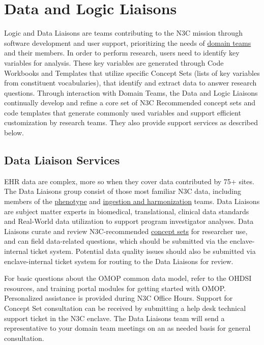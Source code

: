 \documentclass[
  letterpaper,
  DIV=11,
  numbers=noendperiod]{scrreprt}
\begin{document}
\hypertarget{sec-support-liaisons}{%
\section{Data and Logic Liaisons}\label{sec-support-liaisons}}

Logic and Data Liaisons are teams contributing to the N3C mission
through software development and user support, prioritizing the needs of
\protect\hyperlink{domain-teams}{domain teams} and their members. In
order to perform research, users need to identify key variables for
analysis. These key variables are generated through Code Workbooks and
Templates that utilize specific Concept Sets (lists of key variables
from constituent vocabularies), that identify and extract data to answer
research questions. Through interaction with Domain Teams, the Data and
Logic Liaisons continually develop and refine a core set of N3C
Recommended concept sets and code templates that generate commonly used
variables and support efficient customization by research teams. They
also provide support services as described below.

\hypertarget{sec-support-liaisons-data}{%
\subsection{Data Liaison Services}\label{sec-support-liaisons-data}}

EHR data are complex, more so when they cover data contributed by 75+
sites. The Data Liaisons group consist of those most familiar N3C data,
including members of the \protect\hyperlink{phenotype}{phenotype} and
\protect\hyperlink{ingestion-and-harmonization}{ingestion and
harmonization} teams. Data Liaisons are subject matter experts in
biomedical, translational, clinical data standards and Real-World data
utilization to support program investigator analyses. Data Liaisons
curate and review N3C-recommended
\protect\hyperlink{recommended-concept-set}{concept sets} for researcher
use, and can field data-related questions, which should be submitted via
the enclave-internal ticket system. Potential data quality issues should
also be submitted via enclave-internal ticket system for routing to the
Data Liaisons for review.

For basic questions about the OMOP common data model, refer to the OHDSI
resources, and training portal modules for getting started with OMOP.
Personalized assistance is provided during N3C Office Hours. Support for
Concept Set consultation can be received by submitting a help desk
technical support ticket in the N3C enclave. The Data Liaisons team will
send a representative to your domain team meetings on an as needed basis
for general consultation.
\end{document}
